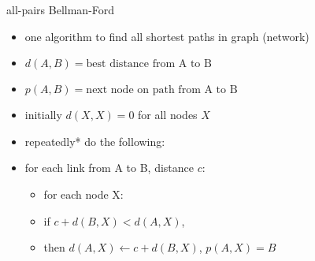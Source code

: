 \usetikzlibrary{arrows.meta,matrix}
\begin{frame}{all-pairs Bellman-Ford}
    \begin{itemize}
    \item one algorithm to find all shortest paths in graph (network)
    \vspace{.5cm}
    \item $d(A,B) = \text{best distance from A to B}$
    \item $p(A,B) = \text{next node on path from A to B}$
    \item initially $d(X,X) = 0$ for all nodes $X$
    \item repeatedly* do the following:
    \vspace{.5cm}
    \item for each link from A to B, distance $c$:
        \begin{itemize}
        \item for each node X:
        \item if $c + d(B, X) < d(A, X)$, \\
        \item then $d(A,X) \leftarrow c+d(B,X)$, $p(A,X) = B$
        \end{itemize}
    \end{itemize}
\end{frame}

